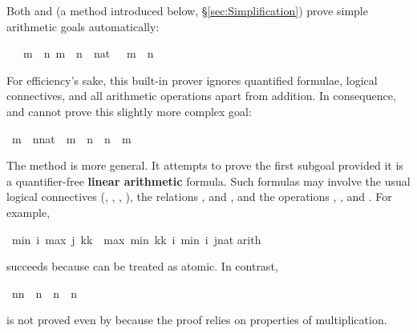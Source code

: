 \begin{isabellebody}
\begin{isamarkuptext}
Both  and 
(a method introduced below, \S\ref{sec:Simplification}) prove 
simple arithmetic goals automatically:%
\end{isamarkuptext}%
\isamarkuptrue%
\ {\isachardoublequote}{\isasymlbrakk}\ {\isasymnot}\ m\ {\isacharless}\ n{\isacharsemicolon}\ m\ {\isacharless}\ n\ {\isacharplus}\ {\isacharparenleft}{}{\isacharcolon}{\isacharcolon}nat{\isacharparenright}\ {\isasymrbrakk}\ {\isasymLongrightarrow}\ m\ {\isacharequal}\ n{\isachardoublequote}\isanewline
\isamarkupfalse%
\isamarkupfalse%
%
\begin{isamarkuptext}%
\noindent
For efficiency's sake, this built-in prover ignores quantified formulae,
logical connectives, and all arithmetic operations apart from addition.
In consequence,  and  cannot prove this slightly more complex goal:%
\end{isamarkuptext}%
\isamarkuptrue%
\ {\isachardoublequote}m\ {\isasymnoteq}\ {\isacharparenleft}n{\isacharcolon}{\isacharcolon}nat{\isacharparenright}\ {\isasymLongrightarrow}\ m\ {\isacharless}\ n\ {\isasymor}\ n\ {\isacharless}\ m{\isachardoublequote}\isanewline
\isamarkupfalse%
\isamarkupfalse%
%
\begin{isamarkuptext}%
\noindent
The method  is more general.  It attempts to prove
the first subgoal provided it is a quantifier-free \textbf{linear arithmetic}
formula.  Such formulas may involve the
usual logical connectives (\isa{{\isasymnot}}, \isa{{\isasymand}}, \isa{{\isasymor}},
\isa{{\isasymlongrightarrow}}), the relations \isa{{\isacharequal}}, \isa{{\isasymle}} and \isa{{\isacharless}},
and the operations
\isa{{\isacharplus}}, \isa{{\isacharminus}},  and . 
For example,%
\end{isamarkuptext}%
\isamarkuptrue%
\ {\isachardoublequote}min\ i\ {\isacharparenleft}max\ j\ {\isacharparenleft}k{\isacharasterisk}k{\isacharparenright}{\isacharparenright}\ {\isacharequal}\ max\ {\isacharparenleft}min\ {\isacharparenleft}k{\isacharasterisk}k{\isacharparenright}\ i{\isacharparenright}\ {\isacharparenleft}min\ i\ {\isacharparenleft}j{\isacharcolon}{\isacharcolon}nat{\isacharparenright}{\isacharparenright}{\isachardoublequote}\isanewline
\isamarkupfalse%
arith{\isacharparenright}\isanewline
\isamarkupfalse%
\isamarkupfalse%
%
\begin{isamarkuptext}%
\noindent
succeeds because  can be treated as atomic. In contrast,%
\end{isamarkuptext}%
\isamarkuptrue%
\ {\isachardoublequote}n{\isacharasterisk}n\ {\isacharequal}\ n\ {\isasymLongrightarrow}\ n{\isacharequal}{}\ {\isasymor}\ n{\isacharequal}{}{\isachardoublequote}\isanewline
\isamarkupfalse%
\isamarkupfalse%
%
\begin{isamarkuptext}%
\noindent
is not proved even by  because the proof relies 
on properties of multiplication.


\end{isamarkuptext}
\end{isabellebody}
